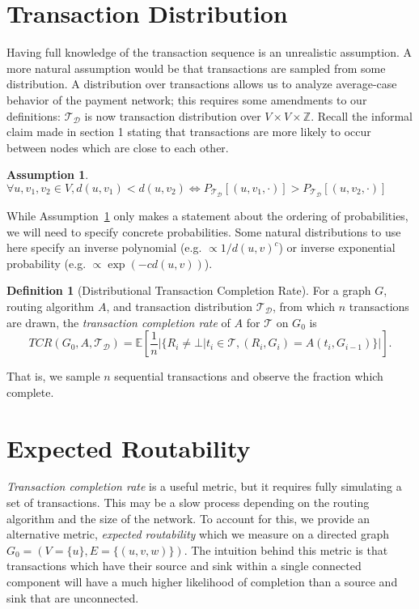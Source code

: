 \documentclass{article}
\newtheorem{assumption}{Assumption}
\theoremstyle{definition}
\newtheorem{definition}{Definition}[section]
\begin{document}
\section{Transaction Distribution}
Having full knowledge of the transaction sequence is an unrealistic assumption. A more natural assumption would be that transactions are sampled from some distribution. A distribution over transactions allows us to analyze average-case behavior of the payment network; this requires some amendments to our definitions:
$\mathcal{T}_{\mathcal{D}}$ is now transaction distribution over $V\times V\times \mathbb{Z}$. Recall the informal claim made in section 1 stating that transactions are more likely to occur between nodes which are close to each other.

\begin{assumption}
  $\forall u, v_1, v_2\in V, d(u, v_1) < d(u, v_2) \iff P_{\mathcal{T}_{\mathcal{D}}}[(u, v_1 , \cdot)] > P_{\mathcal{T}_{\mathcal{D}}}[(u,v_2, \cdot)]$
  \label{ass:closeiscommon}
\end{assumption}

While Assumption~\ref{ass:closeiscommon} only makes a statement about the ordering of probabilities, we will need to specify concrete probabilities. Some natural distributions to use here specify an inverse polynomial (e.g. $\propto 1/d(u,v)^{c}$) or inverse exponential probability (e.g. $\propto \exp(-cd(u,v))$).


\begin{definition}[Distributional Transaction Completion Rate]
\label{def:transcompdistr}
For a graph $G$, routing algorithm $A$, and transaction distribution $\mathcal{T}_{\mathcal{D}}$, from which $n$ transactions are drawn, the \emph{transaction completion rate} of $A$ for $\mathcal{T}$ on $G_0$ is
\[
TCR(G_0, A, \mathcal{T}_{\mathcal{D}})=\mathbb{E}\left[\frac{1}{n}|\lbrace R_i\neq\bot|t_i\in\mathcal{T}, (R_i,G_i)=A(t_i,G_{i-1})\rbrace|\right].
\]
\end{definition}
That is, we sample $n$ sequential transactions and observe the fraction which complete.

\section{Expected Routability}
\emph{Transaction completion rate} is a useful metric, but it requires fully simulating a set of transactions. This may be a slow process depending on the routing algorithm and the size of the network. To account for this, we provide an alternative metric, \emph{expected routability} which we measure on a directed graph $G_0=(V=\lbrace u\rbrace, E=\lbrace (u, v, w)\rbrace)$. The intuition behind this metric is that transactions which have their source and sink within a single connected component will have a much higher likelihood of completion than a source and sink that are unconnected.
\end{document}
